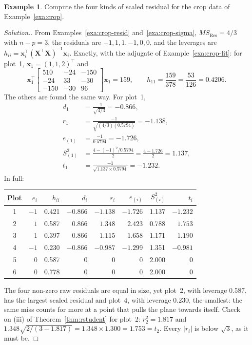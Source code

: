 \documentclass[11pt,a4paper]{article}
\numberwithin{equation}{section}
\theoremstyle{definition}
\newtheorem{exa}[thm]{Example}
\newenvironment{solution}
  {\renewcommand{\qedsymbol}{}\begin{proof}[\textit{Solution}.]}
  {\end{proof}}
\begin{document}
\begin{exa}\label{exa:crop-scaled}
Compute the four kinds of scaled residual for the crop data of Example~\ref{exa:crop}.
\end{exa}

\begin{solution}
From Examples~\ref{exa:crop-resid} and~\ref{exa:crop-sigma}, $MS_{\mathrm{Res}} = 4/3$
with $n - p = 3$, the residuals are $-1, 1, 1, -1, 0, 0$, and the leverages are
$h_{ii} = \mathbf{x}_i^\top(\mathbf{X}^\top\mathbf{X})^{-1}\mathbf{x}_i$. Exactly, with the
adjugate of Example~\ref{exa:crop-fit}: for plot~1, $\mathbf{x}_1 = (1, 1, 2)^\top$ and
\[
\mathbf{x}_1^\top
\begin{bmatrix} 510 & -24 & -150 \\ -24 & 33 & -30 \\ -150 & -30 & 96 \end{bmatrix}
\mathbf{x}_1 = 159 ,
\qquad h_{11} = \frac{159}{378} = \frac{53}{126} = 0.4206 .
\]
The others are found the same way. For plot~1,
\begin{align*}
d_1 &= \frac{-1}{\sqrt{4/3}} = -0.866, \\
r_1 &= \frac{-1}{\sqrt{(4/3)(0.5794)}} = -1.138, \\
e_{(1)} &= \frac{-1}{0.5794} = -1.726, \\
S^2_{(1)} &= \frac{4 - (-1)^2/0.5794}{2} = \frac{4 - 1.726}{2} = 1.137, \\
t_1 &= \frac{-1}{\sqrt{1.137 \times 0.5794}} = -1.232 .
\end{align*}
In full:
\begin{center}
\begin{tabular}{c|rrrrrrr}
Plot & $e_i$ & $h_{ii}$ & $d_i$ & $r_i$ & $e_{(i)}$ & $S^2_{(i)}$ & $t_i$ \\
\hline
1 & $-1$ & 0.421 & $-0.866$ & $-1.138$ & $-1.726$ & 1.137 & $-1.232$ \\
2 & $1$ & 0.587 & $0.866$ & $1.348$ & $2.423$ & 0.788 & $1.753$ \\
3 & $1$ & 0.397 & $0.866$ & $1.115$ & $1.658$ & 1.171 & $1.190$ \\
4 & $-1$ & 0.230 & $-0.866$ & $-0.987$ & $-1.299$ & 1.351 & $-0.981$ \\
5 & $0$ & 0.587 & $0$ & $0$ & $0$ & 2.000 & $0$ \\
6 & $0$ & 0.778 & $0$ & $0$ & $0$ & 2.000 & $0$ \\
\end{tabular}
\end{center}
The four non-zero raw residuals are equal in size, yet plot~2, with leverage $0.587$, has
the largest scaled residual and plot~4, with leverage $0.230$, the smallest: the same miss
counts for more at a point that pulls the plane towards itself. Check on (iii) of
Theorem~\ref{thm:rstudent} for plot~2: $r_2^2 = 1.817$ and
$1.348\sqrt{2/(3 - 1.817)} = 1.348 \times 1.300 = 1.753 = t_2$. Every $|r_i|$ is below
$\sqrt3$, as it must be.
\end{solution}
\end{document}
